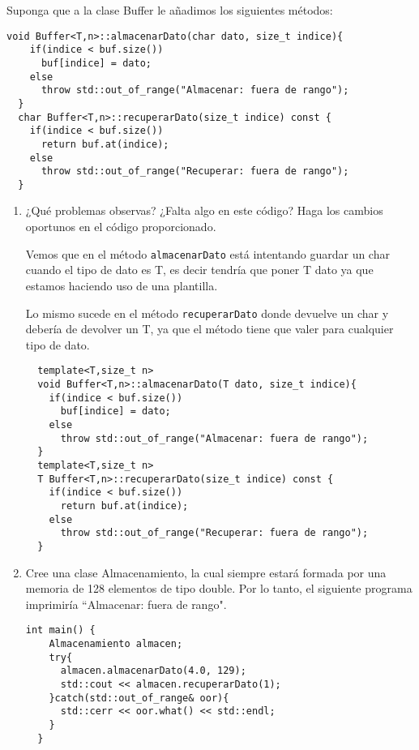  Suponga que a la clase Buffer le añadimos los siguientes métodos:

\begin{center}
    \begin{lstlisting}[frame = single]
  void Buffer<T,n>::almacenarDato(char dato, size_t indice){
    if(indice < buf.size()) 
      buf[indice] = dato;
    else
      throw std::out_of_range("Almacenar: fuera de rango");
  }
  char Buffer<T,n>::recuperarDato(size_t indice) const {
    if(indice < buf.size())
      return buf.at(indice);
    else 
      throw std::out_of_range("Recuperar: fuera de rango");
  }
  \end{lstlisting}
\end{center}
\begin{enumerate}[label = \alph*)]
\item  ¿Qué problemas observas? ¿Falta algo en este código? Haga los cambios oportunos en el código proporcionado.

Vemos que en el método \texttt{almacenarDato} está intentando guardar un char cuando el tipo de dato es T, es decir tendría que poner T dato ya que estamos haciendo uso de una plantilla.

Lo mismo sucede en el método \texttt{recuperarDato} donde devuelve un char y debería de devolver un T, ya que el método tiene que valer para cualquier tipo de dato.

\begin{verbatim}
  template<T,size_t n>
  void Buffer<T,n>::almacenarDato(T dato, size_t indice){
    if(indice < buf.size()) 
      buf[indice] = dato;
    else
      throw std::out_of_range("Almacenar: fuera de rango");
  }
  template<T,size_t n>
  T Buffer<T,n>::recuperarDato(size_t indice) const {
    if(indice < buf.size())
      return buf.at(indice);
    else 
      throw std::out_of_range("Recuperar: fuera de rango");
  }
\end{verbatim}

\item Cree una clase Almacenamiento, la cual siempre estará formada por
una memoria de 128 elementos de tipo double. Por lo tanto, el siguiente programa imprimiría ``Almacenar: fuera de rango".

\begin{center}
  \begin{lstlisting}[frame = single]
  int main() {
    Almacenamiento almacen;
    try{
      almacen.almacenarDato(4.0, 129);
      std::cout << almacen.recuperarDato(1);
    }catch(std::out_of_range& oor){
      std::cerr << oor.what() << std::endl;
    }
  }
  \end{lstlisting}
\end{center}


\end{enumerate}

